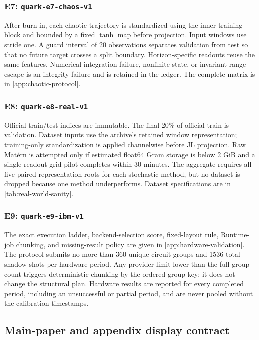 \subsubsection{E7: \texttt{quark-e7-chaos-v1}}
After burn-in, each chaotic trajectory is standardized using the inner-training
block and bounded by a fixed \(\tanh\) map before projection.  Input windows use
stride one.  A guard interval of 20 observations separates validation from
test so that no future target crosses a split boundary.  Horizon-specific
readouts reuse the same features.  Numerical integration failure, nonfinite
state, or invariant-range escape is an integrity failure and is retained in the
ledger.  The complete matrix is in \cref{app:chaotic-protocol}.

\subsubsection{E8: \texttt{quark-e8-real-v1}}
Official train/test indices are immutable.  The final 20\% of official train is
validation.  Dataset inputs use the archive's retained window representation;
training-only standardization is applied channelwise before JL projection.
Raw Mat\'ern is attempted only if estimated float64 Gram storage is below
2 GiB and a single readout-grid pilot completes within 30 minutes.  The
aggregate requires all five paired representation roots for each stochastic
method, but no dataset is dropped because one method underperforms.  Dataset
specifications are in \cref{tab:real-world-sanity}.

\subsubsection{E9: \texttt{quark-e9-ibm-v1}}
The exact execution ladder, backend-selection score, fixed-layout rule,
Runtime-job chunking, and missing-result policy are given in
\cref{app:hardware-validation}.  The protocol submits no more than 360 unique
circuit groups and 1536 total shadow shots per hardware period.  Any provider
limit lower than the full group count triggers deterministic chunking by the
ordered group key; it does not change the structural plan.  Hardware results
are reported for every completed period, including an unsuccessful or partial
period, and are never pooled without the calibration timestamps.

\subsection{Main-paper and appendix display contract}
\label{app:display-contract}

